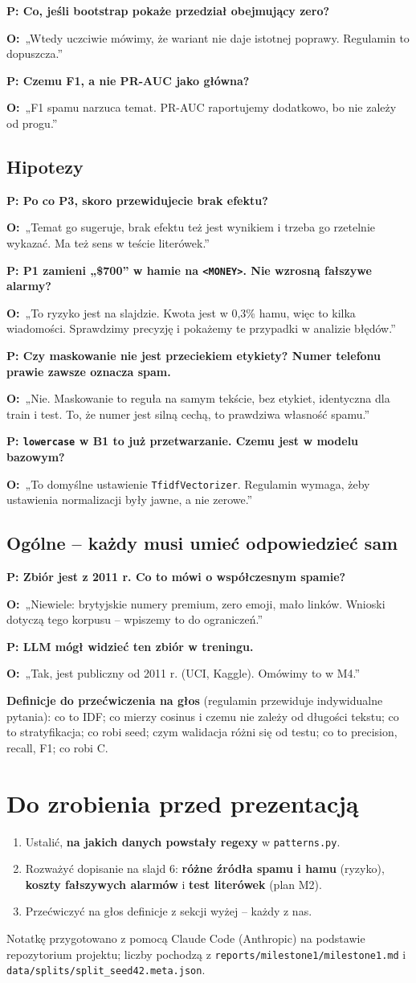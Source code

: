 \documentclass[11pt,a4paper]{article}
\newcommand{\pyt}[1]{\par\medskip\textbf{\color{spam}P: #1}\par}
\newcommand{\odp}{\textbf{O:}~}
\begin{document}
\pyt{Co, jeśli bootstrap pokaże przedział obejmujący zero?}
\odp „Wtedy uczciwie mówimy, że wariant nie daje istotnej poprawy. Regulamin to dopuszcza.”

\pyt{Czemu F1, a nie PR-AUC jako główna?}
\odp „F1 spamu narzuca temat. PR-AUC raportujemy dodatkowo, bo nie zależy od progu.”

\subsection{Hipotezy}

\pyt{Po co P3, skoro przewidujecie brak efektu?}
\odp „Temat go sugeruje, brak efektu też jest wynikiem i trzeba go rzetelnie wykazać. Ma też sens w teście literówek.”

\pyt{P1 zamieni „\$700” w hamie na \texttt{<MONEY>}. Nie wzrosną fałszywe alarmy?}
\odp „To ryzyko jest na slajdzie. Kwota jest w 0,3\% hamu, więc to kilka wiadomości. Sprawdzimy precyzję i pokażemy te
przypadki w analizie błędów.”

\pyt{Czy maskowanie nie jest przeciekiem etykiety? Numer telefonu prawie zawsze oznacza spam.}
\odp „Nie. Maskowanie to reguła na samym tekście, bez etykiet, identyczna dla train i test. To, że numer jest silną cechą,
to prawdziwa własność spamu.”

\pyt{\texttt{lowercase} w B1 to już przetwarzanie. Czemu jest w modelu bazowym?}
\odp „To domyślne ustawienie \texttt{TfidfVectorizer}. Regulamin wymaga, żeby ustawienia normalizacji były jawne, a nie zerowe.”

\subsection{Ogólne -- każdy musi umieć odpowiedzieć sam}

\pyt{Zbiór jest z 2011 r. Co to mówi o współczesnym spamie?}
\odp „Niewiele: brytyjskie numery premium, zero emoji, mało linków. Wnioski dotyczą tego korpusu -- wpiszemy to do ograniczeń.”

\pyt{LLM mógł widzieć ten zbiór w treningu.}
\odp „Tak, jest publiczny od 2011 r. (UCI, Kaggle). Omówimy to w M4.”

\textbf{Definicje do przećwiczenia na głos} (regulamin przewiduje indywidualne pytania): co to IDF; co mierzy cosinus i czemu
nie zależy od długości tekstu; co to stratyfikacja; co robi seed; czym walidacja różni się od testu; co to precision, recall, F1;
co robi C.

\section{Do zrobienia przed prezentacją}
\begin{enumerate}
  \item Ustalić, \textbf{na jakich danych powstały regexy} w \texttt{patterns.py}.
  \item Rozważyć dopisanie na slajd 6: \textbf{różne źródła spamu i hamu} (ryzyko), \textbf{koszty fałszywych alarmów}
        i \textbf{test literówek} (plan M2).
  \item Przećwiczyć na głos definicje z sekcji wyżej -- każdy z nas.
\end{enumerate}

\vfill
{\small\color{ink!60} Notatkę przygotowano z pomocą Claude Code (Anthropic) na podstawie repozytorium projektu;
liczby pochodzą z \texttt{reports/milestone1/milestone1.md} i \texttt{data/splits/split\_seed42.meta.json}.}
\end{document}
